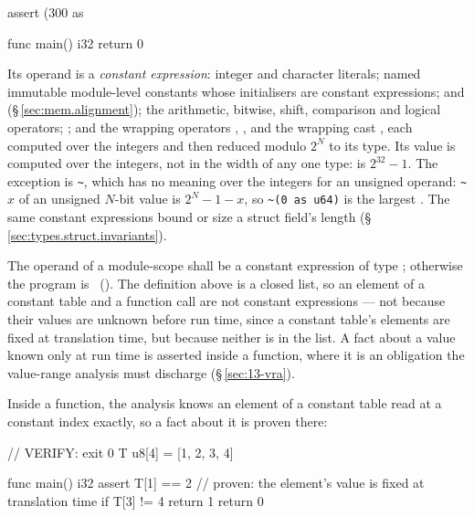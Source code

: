 \begin{laincode}
assert (300 as%

func main() i32 {
    return 0
}
\end{laincode}

\pnum
Its operand is a \emph{constant expression}: integer and character literals; named immutable
module-level constants whose initialisers are constant expressions;  and
 (\S\,\ref{sec:mem.alignment}); the arithmetic, bitwise, shift, comparison and
logical operators; ; and the wrapping operators \lain{+\%}, \lain{-\%}, \lain{*\%} and the
wrapping cast , each computed over the integers and then reduced modulo \(2^N\) to its
type.  Its value is computed over the integers, not in the width of any one type:  is \(2^{32}-1\). The exception is \texttt{\textasciitilde}, which
has no meaning over the integers for an unsigned operand: \texttt{\textasciitilde}$x$ of an
unsigned $N$-bit value is \(2^N - 1 - x\), so \texttt{\textasciitilde(0 as u64)} is the largest
. The same constant expressions bound or size a struct field's length
(\S\,\ref{sec:types.struct.invariants}).

\begin{constraint}
  The operand of a module-scope  shall be a constant expression of type
  ; otherwise the program is \illformed{}~().  The definition above is a
  closed list, so an element of a constant table and a function call are not constant
  expressions --- not because their values are unknown before run time, since a constant table's
  elements are fixed at translation time, but because neither is in the list.  A fact about a value
  known only at run time is asserted inside a function, where it is an obligation the value-range
  analysis must discharge (\S\,\ref{sec:13-vra}).
\end{constraint}

\pnum
Inside a function, the analysis knows an element of a constant table read at a constant index
exactly, so a fact about it is proven there:

\begin{laincode}
// VERIFY: exit 0
T u8[4] = [1, 2, 3, 4]

func main() i32 {
    assert T[1] == 2              // proven: the element's value is fixed at translation time
    if T[3] != 4 { return 1 }
    return 0
}
\end{laincode}

